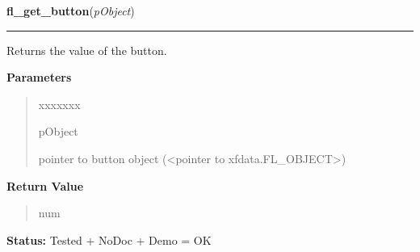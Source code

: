 \hspace{.8\funcindent}\begin{boxedminipage}{\funcwidth}

    \raggedright \textbf{fl\_get\_button}(\textit{pObject})

    \vspace{-1.5ex}

    \rule{\textwidth}{0.5\fboxrule}
\setlength{\parskip}{2ex}
    Returns the value of the button.

\setlength{\parskip}{1ex}
      \textbf{Parameters}
      \vspace{-1ex}

      \begin{quote}
        \begin{Ventry}{xxxxxxx}

          \item[pObject]

          pointer to button object ({\textless}pointer to 
          xfdata.FL\_OBJECT{\textgreater})

        \end{Ventry}

      \end{quote}

      \textbf{Return Value}
    \vspace{-1ex}

      \begin{quote}
      num

      \end{quote}

\textbf{Status:} Tested + NoDoc + Demo = OK



    \end{boxedminipage}

    \label{xformslib:library:fl_set_button}

    \vspace{0.5ex}


